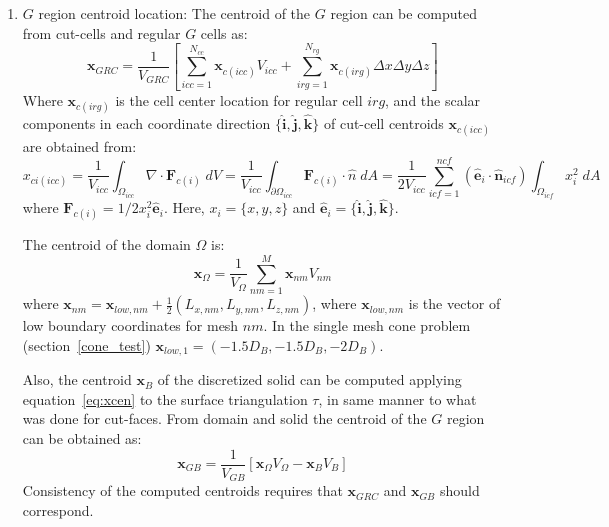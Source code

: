 \documentclass[11pt]{book}
\begin{document}
\begin{enumerate}
    \item $G$ region centroid location:
    The centroid of the $G$ region can be computed from cut-cells and regular $G$ cells as:
    \begin{equation}
       \mathbf{x}_{GRC} = \frac{1}{V_{GRC}}
       \left[  \sum_{icc=1}^{N_{cc}}{\mathbf{x}_{c(icc)}V_{icc}} +  \sum_{irg=1}^{N_{rg}}{\mathbf{x}_{c(irg)} \Delta x \Delta y \Delta z} \right]
    \end{equation}
    Where $\mathbf{x}_{c(irg)}$ is the cell center location for regular cell $irg$, and the scalar components in each coordinate direction  $\{\mathbf{\hat{i}},\mathbf{\hat{j}},\mathbf{\hat{k}}\}$ of cut-cell centroids $\mathbf{x}_{c(icc)}$ are obtained from:
    \begin{equation}
    x_{ci(icc)} = \frac{1}{V_{icc}} \int_{\Omega _{icc}} \nabla \cdot \mathbf{F}_{c(i)} \; dV =
    \frac{1}{V_{icc}} \int_{\partial \Omega _{icc}} \mathbf{F}_{c(i)} \cdot \hat{n} \; dA =
  \frac{1}{2V_{icc}} \sum_{icf=1}^{ncf} (\mathbf{\hat{e}}_i \cdot \mathbf{\hat{n}}_{icf}) \int_{\Omega _{icf}} x_i^2 \; dA
    \label{eq:xcen}
    \end{equation}
    where $\mathbf{F}_{c(i)}=1/2 x_i^2 \mathbf{\hat{e}}_i$. Here, $x_i=\{x,y,z\}$ and $\mathbf{\hat{e}}_i=\{\mathbf{\hat{i}},\mathbf{\hat{j}},\mathbf{\hat{k}}\}$.

    The centroid of the domain $\Omega$ is:
    \begin{equation}
        \mathbf{x}_\Omega = \frac{1}{V_\Omega} \sum_{nm=1}^M  \mathbf{x}_{nm} V_{nm}
    \end{equation}
    where $\mathbf{x}_{nm}=\mathbf{x}_{low,nm}+\frac{1}{2} \left( L_{x,nm},L_{y,nm},L_{z,nm} \right)$, where $\mathbf{x}_{low,nm}$ is the vector of low boundary coordinates for mesh $nm$. In the single mesh cone problem (section~\ref{cone_test}) $\mathbf{x}_{low,1}= \left( -1.5D_B,-1.5D_B,-2D_B \right)$.

    Also, the centroid $\mathbf{x}_B$ of the discretized solid can be computed applying equation~\eqref{eq:xcen} to the surface triangulation $\tau$, in same manner to what was done for cut-faces. From domain and solid the centroid of the $G$ region can be obtained as:
    \begin{equation}
      \mathbf{x}_{GB}=\frac{1}{V_{GB}} \left[ \mathbf{x}_\Omega V_\Omega - \mathbf{x}_B V_B \right]
    \end{equation}
    Consistency of the computed centroids requires that $\mathbf{x}_{GRC}$ and $\mathbf{x}_{GB}$ should correspond.

\end{enumerate}




\fi
\end{document}
